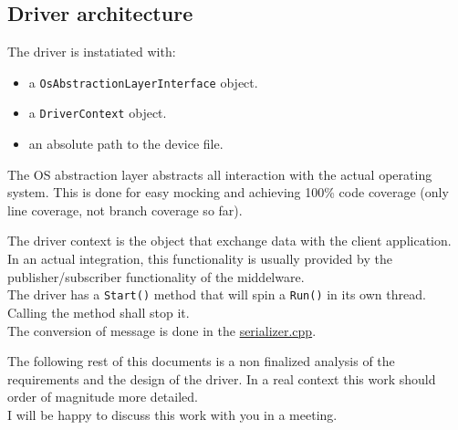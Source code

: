 \subsection{Driver architecture}
The driver is instatiated with:
\begin{itemize}
    \item a \texttt{OsAbstractionLayerInterface} object.
    \item a \texttt{DriverContext} object.
    \item an absolute path to the device file.
\end{itemize}

The OS abstraction layer abstracts all interaction with the actual operating system.
This is done for easy mocking and achieving 100\% code coverage (only line coverage, not branch coverage so far).

The driver context is the object that exchange data with the client application.
In an actual integration, this functionality is usually provided by the publisher/subscriber functionality of the middelware.\\
The driver has a \texttt{Start()} method that will spin a \texttt{Run()} in its own thread.
Calling the  method shall stop it.\\
The conversion of message is done in the \href{https://github.com/renn0xtek9/assignment/blob/master/flight_software/libs/embedded_software/serializer/src/serializer.cpp}{serializer.cpp}.

The following rest of this documents is a non finalized analysis of the requirements and the design of the driver.
In a real context this work should order of magnitude more detailed.\\
I will be happy to discuss this work with you in a meeting.
